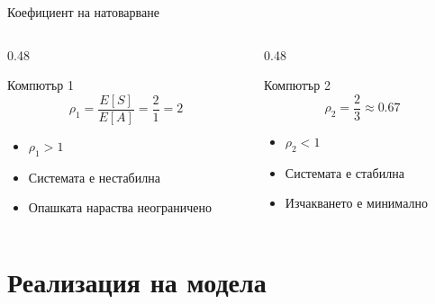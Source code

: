 \documentclass[aspectratio=169]{beamer}
\begin{document}
\begin{frame}{Коефициент на натоварване}
    \begin{columns}[T]
        \begin{column}{0.48\textwidth}
            \begin{block}{Компютър 1}
                \[
                    \rho_1 = \frac{E[S]}{E[A]} = \frac{2}{1} = 2
                \]
                \begin{itemize}
                    \item $\rho_1 > 1$
                    \item Системата е нестабилна
                    \item Опашката нараства неограничено
                \end{itemize}
            \end{block}
        \end{column}
        \begin{column}{0.48\textwidth}
            \begin{block}{Компютър 2}
                \[
                    \rho_2 = \frac{2}{3} \approx 0.67
                \]
                \begin{itemize}
                    \item $\rho_2 < 1$
                    \item Системата е стабилна
                    \item Изчакването е минимално
                \end{itemize}
            \end{block}
        \end{column}
    \end{columns}
\end{frame}

\section{Реализация на модела}
\end{document}
